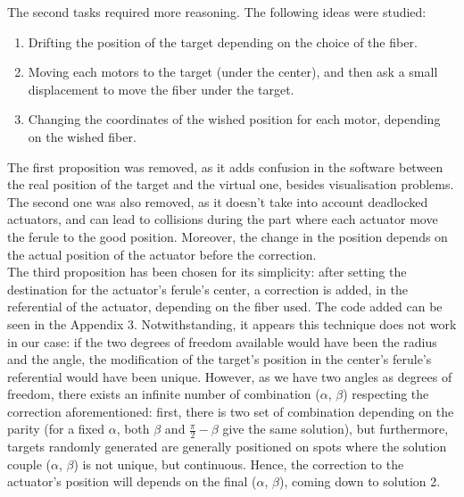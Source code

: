 The second tasks required more reasoning. The following ideas were studied:

\begin{enumerate}
	\item Drifting the position of the target depending on the choice of the fiber.
	\item Moving each motors to the target (under the center), and then ask a small displacement to move the fiber under the target.
	\item Changing the coordinates of the wished position for each motor, depending on the wished fiber.
\end{enumerate}

The first proposition was removed, as it adds confusion in the software between the real position of the target and the virtual one, besides visualisation problems.\\

The second one was also removed, as it doesn't take into account deadlocked actuators, and can lead to collisions during the part where each actuator move the ferule to the good position. Moreover, the change in the position depends on the actual position of the actuator before the correction. \\

The third proposition has been chosen for its simplicity: after setting the destination for the actuator's ferule's center, a correction is added, in the referential of the actuator, depending on the fiber used. The code added can be seen in the Appendix 3. Notwithstanding, it appears this technique does not work in our case: if the two degrees of freedom available would have been the radius and the angle, the modification of the target's position in the center's ferule's referential would have been unique. However, as we have two angles as degrees of freedom, there exists  an infinite number of combination ($\alpha$, $\beta$) respecting the correction aforementioned: first, there is two set of combination depending on the parity (for a fixed $\alpha$, both $\beta$ and $\frac{\pi}{2}-\beta$ give the same solution), but furthermore, targets randomly generated are generally positioned on spots where the solution couple ($\alpha$, $\beta$) is not unique, but continuous. Hence, the correction to the actuator's position will depends on the final ($\alpha$, $\beta$), coming down to solution 2.

